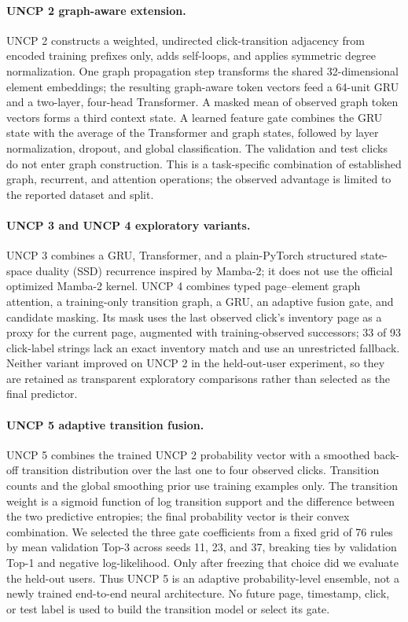 \documentclass[sn-mathphys-num, Numbered]{sn-jnl}%
\theoremstyle{thmstyleone}%
\theoremstyle{thmstyletwo}%
\theoremstyle{thmstylethree}%
\begin{document}
\paragraph{UNCP 2 graph-aware extension.} UNCP 2 constructs a weighted, undirected click-transition adjacency from encoded training prefixes only, adds self-loops, and applies symmetric degree normalization. One graph propagation step transforms the shared 32-dimensional element embeddings; the resulting graph-aware token vectors feed a 64-unit GRU and a two-layer, four-head Transformer. A masked mean of observed graph token vectors forms a third context state. A learned feature gate combines the GRU state with the average of the Transformer and graph states, followed by layer normalization, dropout, and global classification. The validation and test clicks do not enter graph construction. This is a task-specific combination of established graph, recurrent, and attention operations; the observed advantage is limited to the reported dataset and split.

\paragraph{UNCP 3 and UNCP 4 exploratory variants.} UNCP 3 combines a GRU, Transformer, and a plain-PyTorch structured state-space duality (SSD) recurrence inspired by Mamba-2; it does not use the official optimized Mamba-2 kernel. UNCP 4 combines typed page--element graph attention, a training-only transition graph, a GRU, an adaptive fusion gate, and candidate masking. Its mask uses the last observed click's inventory page as a proxy for the current page, augmented with training-observed successors; 33 of 93 click-label strings lack an exact inventory match and use an unrestricted fallback. Neither variant improved on UNCP 2 in the held-out-user experiment, so they are retained as transparent exploratory comparisons rather than selected as the final predictor.

\paragraph{UNCP 5 adaptive transition fusion.} UNCP 5 combines the trained UNCP 2 probability vector with a smoothed back-off transition distribution over the last one to four observed clicks. Transition counts and the global smoothing prior use training examples only. The transition weight is a sigmoid function of log transition support and the difference between the two predictive entropies; the final probability vector is their convex combination. We selected the three gate coefficients from a fixed grid of 76 rules by mean validation Top-3 across seeds 11, 23, and 37, breaking ties by validation Top-1 and negative log-likelihood. Only after freezing that choice did we evaluate the held-out users. Thus UNCP 5 is an adaptive probability-level ensemble, not a newly trained end-to-end neural architecture. No future page, timestamp, click, or test label is used to build the transition model or select its gate.
\end{document}
